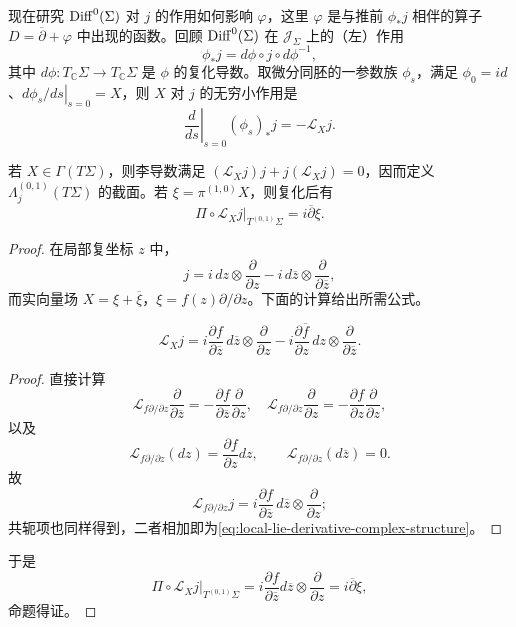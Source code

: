 现在研究 $\operatorname{Diff}^0(\Sigma)$ 对 $j$ 的作用如何影响 $\varphi$，这里 $\varphi$ 是与推前
$\phi_*j$ 相伴的算子 $D=\overline\partial+\varphi$ 中出现的函数。回顾 $\operatorname{Diff}^0(\Sigma)$
在 $\mathcal J_\Sigma$ 上的（左）作用
\[
 \phi_*j=d\phi\circ j\circ d\phi^{-1},
\]
其中 $d\phi:T_{\mathbb C}\Sigma\to T_{\mathbb C}\Sigma$ 是 $\phi$ 的复化导数。取微分同胚的一参数族 $\phi_s$，满足
$\phi_0=id$、$\left.d\phi_s/ds\right|_{s=0}=X$，则 $X$ 对 $j$ 的无穷小作用是
\[
 \left.\frac d{ds}\right|_{s=0}(\phi_s)_*j=-\mathcal L_Xj.
\]

\begin{proposition}\label{prop:lie-derivative-dolbeault}
若 $X\in\Gamma(T\Sigma)$，则李导数满足
$(\mathcal L_Xj)j+j(\mathcal L_Xj)=0$，因而定义
$\Lambda_j^{(0,1)}(T\Sigma)$ 的截面。若 $\xi=\pi^{(1,0)}X$，则复化后有
\[
 \left.\Pi\circ\mathcal L_Xj\right|_{T^{(0,1)}\Sigma}
 =i\overline\partial\xi.
\]
\end{proposition}

\begin{proof}
在局部复坐标 $z$ 中，
\[
 j=i\,dz\otimes\frac\partial{\partial z}
 -i\,d\overline z\otimes\frac\partial{\partial\overline z},
\]
而实向量场 $X=\xi+\overline\xi$，$\xi=f(z)\partial/\partial z$。下面的计算给出所需公式。
\begin{lemma}\label{lem:local-lie-derivative-complex-structure}
\begin{equation}
 \mathcal L_Xj
 =i\frac{\partial f}{\partial\overline z}\,d\overline z\otimes\frac\partial{\partial z}
 -i\frac{\partial\overline f}{\partial z}\,dz\otimes\frac\partial{\partial\overline z}.
 \label{eq:local-lie-derivative-complex-structure}
\end{equation}
\end{lemma}
\begin{proof}
直接计算
\[
 \mathcal L_{f\partial/\partial z}\frac\partial{\partial\overline z}
 =-\frac{\partial f}{\partial\overline z}\frac\partial{\partial z},
 \quad
 \mathcal L_{f\partial/\partial z}\frac\partial{\partial z}
 =-\frac{\partial f}{\partial z}\frac\partial{\partial z},
\]
以及
\[
 \mathcal L_{f\partial/\partial z}(dz)=\frac{\partial f}{\partial z}dz,
 \qquad
 \mathcal L_{f\partial/\partial z}(d\overline z)=0.
\]
故
\[
 \mathcal L_{f\partial/\partial z}j
 =i\frac{\partial f}{\partial\overline z}\,d\overline z\otimes\frac\partial{\partial z};
\]
共轭项也同样得到，二者相加即为\eqref{eq:local-lie-derivative-complex-structure}。
\end{proof}
于是
\[
 \left.\Pi\circ\mathcal L_Xj\right|_{T^{(0,1)}\Sigma}
 =i\frac{\partial f}{\partial\overline z}d\overline z\otimes\frac\partial{\partial z}
 =i\overline\partial\xi,
\]
命题得证。
\end{proof}

